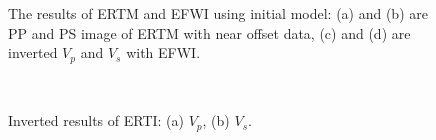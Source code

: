 \documentclass[extra,mreferee]{gji}
\begin{document}
\begin{figure}
   \centering
   \\
   \\
   \caption{The results of ERTM and EFWI using initial model: (a) and (b) are PP and
   PS image of ERTM with near offset data, (c) and (d) are inverted $V_p$ and $V_s$
   with EFWI.}
   \label{fig:Results_init}
\end{figure}
\clearpage
\begin{figure}
   \centering
   \\
   \caption{Inverted results of ERTI: (a) $V_p$, (b) $V_s$.}
   \label{fig:InvertedModel_ERTI}
\end{figure}
\end{document}
